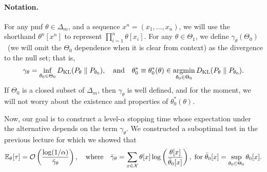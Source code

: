 \documentclass[12pt]{article}
\begin{document}
\paragraph{Notation.} For any pmf $\theta \in \Delta_m$, and a sequence $x^n = (x_1, \ldots, x_n)$, we will use the shorthand $\theta^n[x^n]$ to represent $\prod_{i=1}^n \theta[x_i]$. For any $\theta \in \Theta_1$, we define $\gamma_\theta(\Theta_0)$~(we will omit the $\Theta_0$ dependence when it is clear from context) as the divergence to the null set; that is, 
\begin{align}
\gamma_{\theta} = \inf_{\theta_0 \in \Theta_0} D_{\text{KL}}(P_\theta \parallel P_{\theta_0}), \quad \text{and} \quad \theta_0^* \equiv \theta_0^*(\theta) \in \operatorname*{argmin}_{\theta_0 \in \Theta_0}D_{\text{KL}}(P_\theta \parallel P_{\theta_0}). 
\end{align}
If $\Theta_0$ is a closed subset of $\Delta_m$, then $\gamma_{\theta}$ is well defined, and for the moment, we will not worry about the existence and properties of $\theta^*_0(\theta)$. 

Now, our goal is to construct a level-$\alpha$ stopping time whose expectation under the alternative depends on the term $\gamma_\theta$. We constructed a suboptimal test in the previous lecture for which we showed that 
\begin{align}
    \mathbb{E}_{\theta}[\tau] = \mathcal{O}\left( \frac{\log(1/\alpha)}{\bar{\gamma}_\theta} \right), \quad \text{where} \quad \bar{\gamma}_{\theta} = \sum_{x \in {\cal X}} \theta[x] \log \left( \frac{\theta[x]}{\bar{\theta}_0[x]} \right), \;\text{for}\; \bar{\theta}_0[x] = \sup_{\theta_0 \in \Theta_0} \theta_0[x]. 
\end{align}
\end{document}
